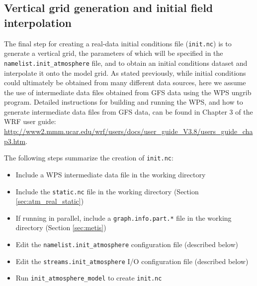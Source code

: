 \subsection{Vertical grid generation and initial field interpolation}
\label{sec:atm_real_met}

The final step for creating a real-data initial conditions file ({\tt init.nc}) is to generate a vertical grid, the parameters of which will be specified in the {\tt namelist.init\_atmosphere} file, and to obtain an initial conditions dataset and interpolate it onto the model grid. As stated previously, while initial conditions could ultimately be obtained from many different data sources, here we assume the use of intermediate data files obtained from GFS data using the WPS ungrib program.  Detailed instructions for building and running the WPS, and how to generate intermediate data files from GFS data, can be found in Chapter 3 of the WRF user guide: \\
\url{http://www2.mmm.ucar.edu/wrf/users/docs/user_guide_V3.8/users_guide_chap3.htm}.

The following steps summarize the creation of {\tt init.nc}:

\begin{itemize}
\item Include a WPS intermediate data file in the working directory
\item Include the {\tt static.nc} file in the working directory (Section \ref{sec:atm_real_static})
\item If running in parallel, include a {\tt graph.info.part.*} file in the working directory (Section \ref{sec:metis})
\item Edit the {\tt namelist.init\_atmosphere} configuration file (described below)
\item Edit the {\tt streams.init\_atmosphere} I/O configuration file (described below)
\item Run {\tt init\_atmosphere\_model} to create {\tt init.nc}
\end{itemize}


